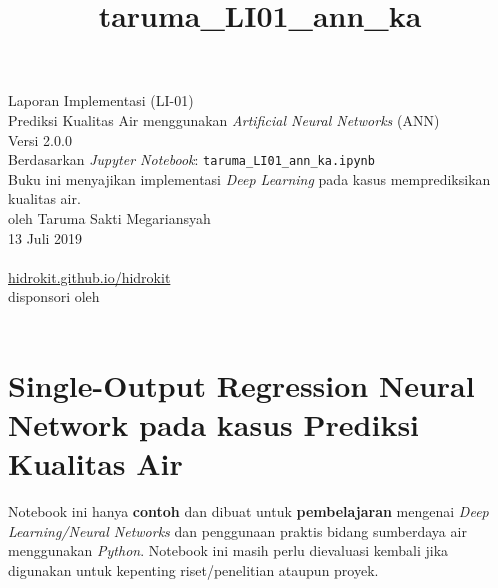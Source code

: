 \documentclass[11pt]{article}
\title{taruma\_LI01\_ann\_ka}
\begin{document}
    

	\begin{titlepage}
		\vspace*{\fill}
		\begin{center}
 		\normalsize Laporan Implementasi (LI-01)\\
		\huge Prediksi Kualitas Air menggunakan \emph{Artificial Neural Networks} (ANN) \\ 
		\normalsize Versi 2.0.0 \\[0.2cm]
      	\small Berdasarkan \emph{Jupyter Notebook}: \texttt{taruma\_LI01\_ann\_ka.ipynb} \\[0.5cm]
      	\normalsize Buku ini menyajikan implementasi \emph{Deep Learning} pada kasus memprediksikan kualitas air. \\[0.5cm]
		\normalsize oleh Taruma Sakti Megariansyah\\[0.5cm]
      	\normalsize 13 Juli 2019\\[1cm]
    	\\
      	\normalsize \href{https://hidrokit.github.io/hidrokit}{hidrokit.github.io/hidrokit}  \\[0.5cm]
      	\small disponsori oleh \\[0.2cm]
    	\href{https://www.fiako.co.id}{}\\
		\end{center}
    	\vspace*{\fill}
	\end{titlepage}

    

    
    \hypertarget{single-output-regression-neural-network-pada-kasus-prediksi-kualitas-air}{%
\section{Single-Output Regression Neural Network pada kasus Prediksi
Kualitas
Air}\label{single-output-regression-neural-network-pada-kasus-prediksi-kualitas-air}}

Notebook ini hanya \textbf{contoh} dan dibuat untuk
\textbf{pembelajaran} mengenai \emph{Deep Learning/Neural Networks} dan
penggunaan praktis bidang sumberdaya air menggunakan \emph{Python}.
Notebook ini masih perlu dievaluasi kembali jika digunakan untuk
kepenting riset/penelitian ataupun proyek.
\end{document}
